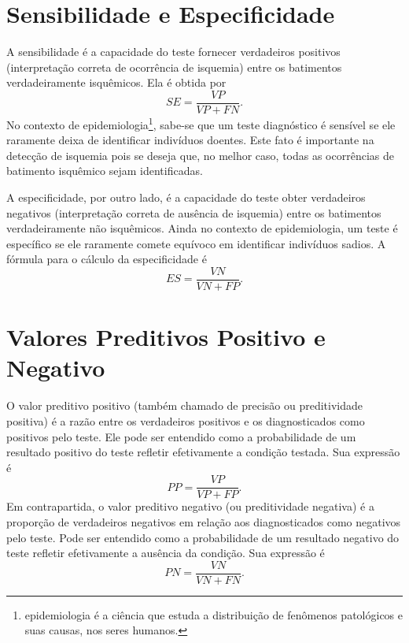 \section{Sensibilidade e Especificidade}
A sensibilidade é a capacidade do teste fornecer verdadeiros positivos (interpretação correta de ocorrência de isquemia) entre os batimentos verdadeiramente isquêmicos. Ela é obtida por
\begin{equation}
    SE = \dfrac{VP}{VP+FN}.
\end{equation}
No contexto de epidemiologia\footnote{epidemiologia é a ciência que estuda a distribuição de fenômenos patológicos e suas causas, nos seres humanos.}, sabe-se que um teste diagnóstico é sensível se ele raramente deixa de identificar indivíduos doentes. Este fato é importante na detecção de isquemia pois se deseja que, no melhor caso, todas as ocorrências de batimento isquêmico sejam identificadas.

A especificidade, por outro lado, é a capacidade do teste obter verdadeiros negativos (interpretação correta de ausência de isquemia) entre os batimentos verdadeiramente não isquêmicos. Ainda no contexto de epidemiologia, um teste é específico se ele raramente comete equívoco em identificar indivíduos sadios. A fórmula para o cálculo da especificidade é
\begin{equation}
    ES = \frac{VN}{VN+FP}.
\end{equation}

\section{Valores Preditivos Positivo e Negativo}
O valor preditivo positivo (também chamado de precisão ou preditividade positiva) é a razão entre os verdadeiros positivos e os diagnosticados como positivos pelo teste. Ele pode ser entendido como a probabilidade de um resultado positivo do teste refletir efetivamente a condição testada. Sua expressão é
\begin{equation}
    PP = \frac{VP}{VP+FP}.
\end{equation}
Em contrapartida, o valor preditivo negativo (ou preditividade negativa) é a proporção de verdadeiros negativos em relação aos diagnosticados como negativos pelo teste. Pode ser entendido como a probabilidade de um resultado negativo do teste refletir efetivamente a ausência da condição. Sua expressão é
\begin{equation}
    PN = \frac{VN}{VN+FN}.
\end{equation}

